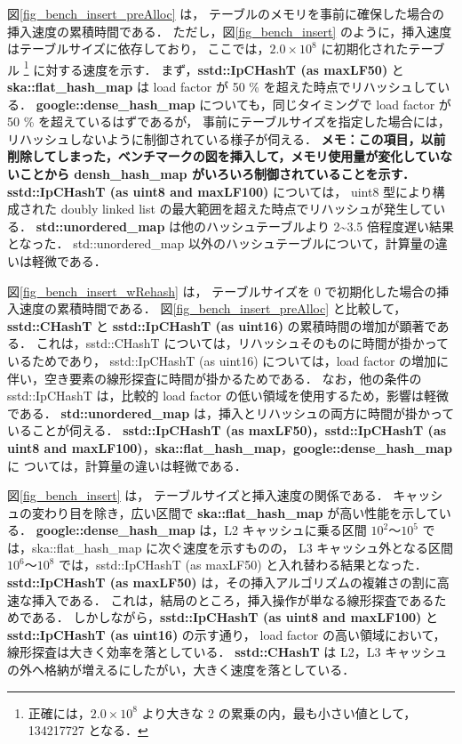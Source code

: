図\ref{fig_bench_insert_preAlloc} は，
テーブルのメモリを事前に確保した場合の挿入速度の累積時間である．
ただし，図\ref{fig_bench_insert} のように，挿入速度はテーブルサイズに依存しており，
ここでは，$2.0\times10^8$ に初期化されたテーブル
\footnote{
  正確には，$2.0\times10^8$ より大きな 2 の累乗の内，最も小さい値として，134217727 となる．
}
に対する速度を示す．
まず，{\bf sstd::IpCHashT (as maxLF50)} と {\bf ska::flat\_hash\_map} は load factor が 50 \% を超えた時点でリハッシュしている．
{\bf google::dense\_hash\_map} についても，同じタイミングで load factor が 50 \% を超えているはずであるが，
事前にテーブルサイズを指定した場合には，リハッシュしないように制御されている様子が伺える．
{\bf \color{red}メモ：この項目，以前削除してしまった，ベンチマークの図を挿入して，メモリ使用量が変化していないことから densh\_hash\_map がいろいろ制御されていることを示す．}
{\bf sstd::IpCHashT (as uint8 and maxLF100)} については，
uint8 型により構成された doubly linked list の最大範囲を超えた時点でリハッシュが発生している．
{\bf std::unordered\_map} は他のハッシュテーブルより 2\textasciitilde 3.5 倍程度遅い結果となった．
std::unordered\_map 以外のハッシュテーブルについて，計算量の違いは軽微である．

図\ref{fig_bench_insert_wRehash} は，
テーブルサイズを 0 で初期化した場合の挿入速度の累積時間である．
図\ref{fig_bench_insert_preAlloc} と比較して，
{\bf sstd::CHashT} と {\bf sstd::IpCHashT (as uint16)} の累積時間の増加が顕著である．
これは，sstd::CHashT については，リハッシュそのものに時間が掛かっているためであり，
sstd::IpCHashT (as uint16) については，load factor の増加に伴い，空き要素の線形探査に時間が掛かるためである．
なお，他の条件の sstd::IpCHashT は，比較的 load factor の低い領域を使用するため，影響は軽微である．
{\bf std::unordered\_map} は，挿入とリハッシュの両方に時間が掛かっていることが伺える．
{\bf sstd::IpCHashT (as maxLF50)}，{\bf sstd::IpCHashT (as uint8 and maxLF100)}，{\bf ska::flat\_hash\_map}，{\bf google::dense\_hash\_map} に
ついては，計算量の違いは軽微である．

図\ref{fig_bench_insert} は，
テーブルサイズと挿入速度の関係である．
キャッシュの変わり目を除き，広い区間で {\bf ska::flat\_hash\_map} が高い性能を示している．
{\bf google::dense\_hash\_map} は，L2 キャッシュに乗る区間 $10^2〜 10^5$ では，ska::flat\_hash\_map に次ぐ速度を示すものの，
L3 キャッシュ外となる区間 $10^6〜 10^8$ では，sstd::IpCHashT (as maxLF50) と入れ替わる結果となった．
{\bf sstd::IpCHashT (as maxLF50)} は，その挿入アルゴリズムの複雑さの割に高速な挿入である．
これは，結局のところ，挿入操作が単なる線形探査であるためである．
しかしながら，{\bf sstd::IpCHashT (as uint8 and maxLF100)} と {\bf sstd::IpCHashT (as uint16)} の示す通り，
load factor の高い領域において，線形探査は大きく効率を落としている．
{\bf sstd::CHashT} は L2，L3 キャッシュの外へ格納が増えるにしたがい，大きく速度を落としている．
\leavevmode \newline

